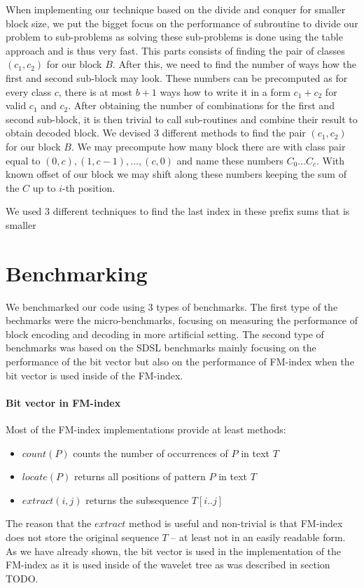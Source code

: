 When implementing our technique based on the divide and conquer for smaller block size,
we put the bigget focus on the performance of subroutine to divide our problem to sub-problems as
solving these sub-problems is done using the table approach and is thus very fast. This
parts consists of finding the pair of classes $(c_1, c_2)$ for our block $B$. After this,
we need to find the number of ways how the first and second sub-block may look.
These numbers can be precomputed as for every class $c$, there is at most $b+1$ ways how to
write it in a form $c_1+c_2$ for valid $c_1$ and $c_2$. After obtaining the number of combinations
for the first and second sub-block, it is then trivial to call sub-routines and combine their result
to obtain decoded block. We devised 3 different methods to find the pair $(c_1, c_2)$ for our block $B$.
We may precompute how many block there are with class pair equal to $(0, c), (1, c-1),\ldots ,
(c, 0)$ and name these numbers $C_{0}\ldots C_{c}$. With known offset of our block we may shift
along these numbers keeping the sum of the $C$ up to $i$-th position.

We used 3 different techniques to find the last index in these prefix sums that is smaller 




\section{Benchmarking}

We benchmarked our code using 3 types of benchmarks. The first type of the bechmarks
were the micro-benchmarks, focusing on measuring the performance of block encoding
and decoding in more artificial setting. The second type of benchmarks was based on
the SDSL benchmarks mainly focusing on the performance of the bit vector but also
on the performance of FM-index when the bit vector is used inside of the FM-index.

\paragraph{Bit vector in FM-index}
Most of the FM-index implementations provide at least methods:
\begin{itemize}
	\item $\mathit{count}(P)$ counts the number of occurrences of $P$ in text $T$
	\item $\mathit{locate}(P)$ returns all positions of pattern $P$ in text $T$
	\item $\mathit{extract}(i, j)$ returns the subsequence $T[i..j]$
\end{itemize}
The reason that the $\mathit{extract}$ method is useful and non-trivial is that FM-index
does not store the original sequence $T$ -- at least not in an easily readable form.
As we have already shown, the bit vector is used in the implementation of the FM-index as it is
used inside of the wavelet tree as was described in section TODO.